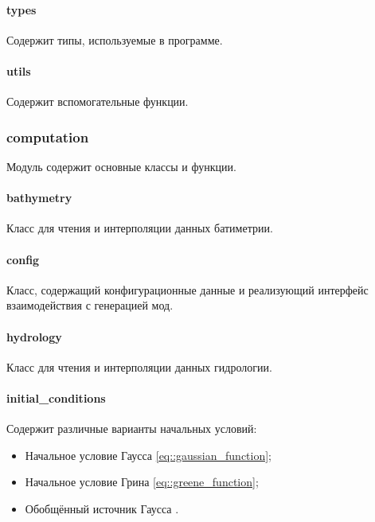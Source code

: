 \documentclass{fefu}
\begin{document}
                \paragraph{types}
                    \par Содержит типы, используемые в программе.
                \paragraph{utils}
                    \par Содержит вспомогательные функции.
            \subsubsection{computation}
                \par Модуль содержит основные классы и функции.               
                \paragraph{bathymetry}
                    \par Класс для чтения и интерполяции данных батиметрии.
                \paragraph{config}   
                    \par Класс, содержащий конфигурационные данные и реализующий интерфейс взаимодействия с генерацией мод.
                \paragraph{hydrology}
                    \par Класс для чтения и интерполяции данных гидрологии. 
                \paragraph{initial\_conditions}
                    \par Содержит различные варианты начальных условий:
                    \begin{itemize}
                        \item Начальное условие Гаусса \eqref{eq::gaussian_function};
                        \item Начальное условие Грина \eqref{eq::greene_function};
                        \item Обобщённый источник Гаусса \cite{jensen}.
                    \end{itemize}
\end{document}
